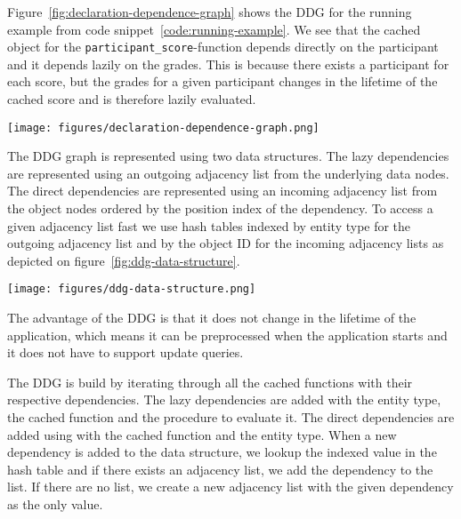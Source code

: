 Figure~\ref{fig:declaration-dependence-graph} shows the DDG for the running example from code snippet~\ref{code:running-example}. We see that the cached object for the \verb$participant_score$-function depends directly on the participant and it depends lazily on the grades. This is because there exists a participant for each score, but the grades for a given participant changes in the lifetime of the cached score and is therefore lazily evaluated.

\begin{figure*}[ht!]
  \centering
  \texttt{[image: figures/declaration-dependence-graph.png]}
  \caption{The Declaration Dependence Graph of the running example}
  \label{fig:declaration-dependence-graph}
\end{figure*}

The DDG graph is represented using two data structures. The lazy dependencies are represented using an outgoing adjacency list from the underlying data nodes. The direct dependencies are represented using an incoming adjacency list from the object nodes ordered by the position index of the dependency. To access a given adjacency list fast we use hash tables indexed by entity type for the outgoing adjacency list and by the object ID for the incoming adjacency lists as depicted on figure~\ref{fig:ddg-data-structure}.

\begin{figure*}[ht!]
  \centering
  \texttt{[image: figures/ddg-data-structure.png]}
  \caption{An illustration of the data structure representing the DDG on figure~\ref{fig:declaration-dependence-graph}}
  \label{fig:ddg-data-structure}
\end{figure*}

The advantage of the DDG is that it does not change in the lifetime of the application, which means it can be preprocessed when the application starts and it does not have to support update queries.

The DDG is build by iterating through all the cached functions with their respective dependencies. The lazy dependencies are added with the entity type, the cached function and the procedure to evaluate it. The direct dependencies are added using with the cached function and the entity type. When a new dependency is added to the data structure, we lookup the indexed value in the hash table and if there exists an adjacency list, we add the dependency to the list. If there are no list, we create a new adjacency list with the given dependency as the only value.

